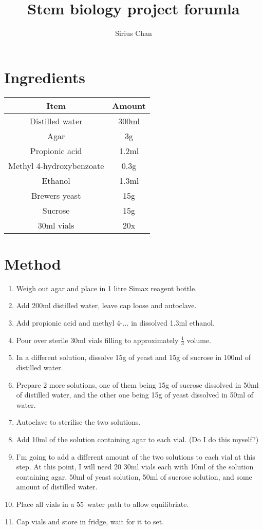 \documentclass{article}
\title{Stem biology project forumla}
\author{Sirius Chan}
\begin{document}
\maketitle
\section*{Ingredients}
{
\centering
\begin{tabular}{|c|c|}
  \hline
  Item & Amount\\
  \hline
  \hline
  Distilled water & 300ml\\
  Agar & 3g\\
  Propionic acid & 1.2ml\\
  Methyl 4-hydroxybenzoate & 0.3g\\
  Ethanol & 1.3ml\\
  Brewers yeast & 15g\\
  Sucrose & 15g\\
  30ml vials & 20x\\
  \hline
\end{tabular}
\par
}

\section*{Method}
\begin{enumerate}
  \item Weigh out agar and place in 1 litre Simax reagent bottle.
  \item Add 200ml distilled water, leave cap loose and autoclave.
  \item Add propionic acid and methyl 4-$\dots$ in dissolved 1.3ml ethanol.
  \item Pour over sterile 30ml vials filling to approximately $\frac{1}{3}$ volume.
  \item In a different solution, dissolve 15g of yeast and 15g of sucrose in 100ml of distilled water.
  \item Prepare 2 more solutions, one of them being 15g of sucrose dissolved in 50ml of distilled water, and the other one being 15g of yeast dissolved in 50ml of water.
  \item Autoclave to sterilise the two solutions.
  \item Add 10ml of the solution containing agar to each vial. (Do I do this myself?)
  \item I'm going to add a different amount of the two solutions to each vial at this step. At this point, I will need 20 30ml vials each with 10ml of the solution containing agar, 50ml of yeast solution, 50ml of sucrose solution, and some amount of distilled water.
  \item Place all vials in a 55\textcelsius~water path to allow equilibriate.
  \item Cap vials and store in fridge, wait for it to set.
\end{enumerate}
\end{document}
